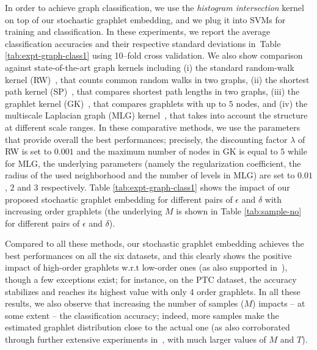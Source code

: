 \documentclass[journal]{IEEEtran}
\theoremstyle{definition}
\newcommand{\tab}[1]{Table \ref{#1}}
\begin{document}
In order to achieve graph classification, we use the \emph{histogram intersection} kernel~\cite{Barla2003} on top of our stochastic graphlet embedding, and we plug it into SVMs for training and classification. In these experiments, we report the average classification accuracies and their respective standard deviations in~\tab{tab:expt-graph-class1} using 10--fold cross validation. We also show comparison against state-of-the-art graph kernels including (i) the standard random-walk kernel (RW)~\cite{Vishwanathan2010}, that counts common random walks in two graphs, (ii) the shortest path kernel (SP)~\cite{Borgwardt2005}, that compares shortest path lengths in two graphs, (iii) the graphlet kernel (GK)~\cite{Shervashidze2009}, that compares graphlets with up to $5$ nodes, and (iv) the multiscale Laplacian graph (MLG) kernel~\cite{Kondor2016}, that takes into account the structure at different scale ranges. In these comparative methods, we use the parameters that provide overall the best performances; precisely, the discounting factor $\lambda$ of RW is set to $0.001$ and the maximum number of nodes in GK is equal to $5$ while for MLG, the underlying parameters (namely the regularization coefficient, the radius of the used neighborhood and the number of levels in MLG) are set to $0.01$, $2$ and $3$ respectively. \tab{tab:expt-graph-class1} shows the impact of our proposed stochastic graphlet embedding for different pairs of $\epsilon$ and $\delta$ with increasing order graphlets (the underlying $M$ is shown in \tab{tab:sample-no} for different pairs of $\epsilon$ and $\delta$).

Compared to all these methods, our stochastic graphlet embedding achieves the best performances on all the six datasets, and this clearly shows the positive impact of high-order graphlets w.r.t low-order ones (as also supported in~\cite{Shervashidze2009}), though a few exceptions exist; for instance, on the PTC dataset, the accuracy stabilizes and reaches its highest value with only 4 order graphlets. In all these results, we also observe that increasing the number of samples ($M$) impacts -- at some extent -- the classification accuracy; indeed, more samples make the estimated graphlet distribution close to the actual one (as also corroborated through further extensive experiments in~\cite{Dutta2018SGEsupp}, with much larger values of $M$ and $T$).
\end{document}
